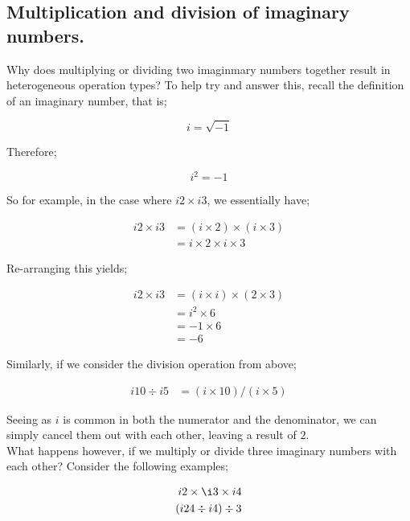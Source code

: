 \documentclass{article}
\begin{document}
\subsection{Multiplication and division of imaginary numbers.}

Why does multiplying or dividing two imaginmary numbers together result in heterogeneous operation types?
To help try and answer this, recall the definition of an imaginary number, that is;

\begin{equation*}
i = \sqrt{-1}
\end{equation*}

Therefore;

\begin{equation*}
i^{2} = -1
\end{equation*}

So for example, in the case where $i2 \times i3$, we essentially have;

\begin{align*}
i2 \times i3 &= (i \times 2) \times (i \times 3) \\
             &= i \times 2 \times i \times 3
\end{align*}

Re-arranging this yields;

\begin{align*}
i2 \times i3 &= (i \times i) \times (2 \times 3) \\
             &= i^{2} \times 6 \\
             &= -1 \times 6 \\
             &= -6
\end{align*}

Similarly, if we consider the division operation from above;

\begin{align*}
i10 \div i5 &= (i \times 10) / (i \times 5)
\end{align*}

Seeing as $i$ is common in both the numerator and the denominator, we can simply cancel them out with each other,
leaving a result of $2$.\\

What happens however, if we multiply or divide three imaginary numbers with each other? Consider the following
examples;

\begin{align*}
i2 \times \i3 \times i4 \\
(i24 \div i4) \div 3 
\end{align*}
\end{document}
